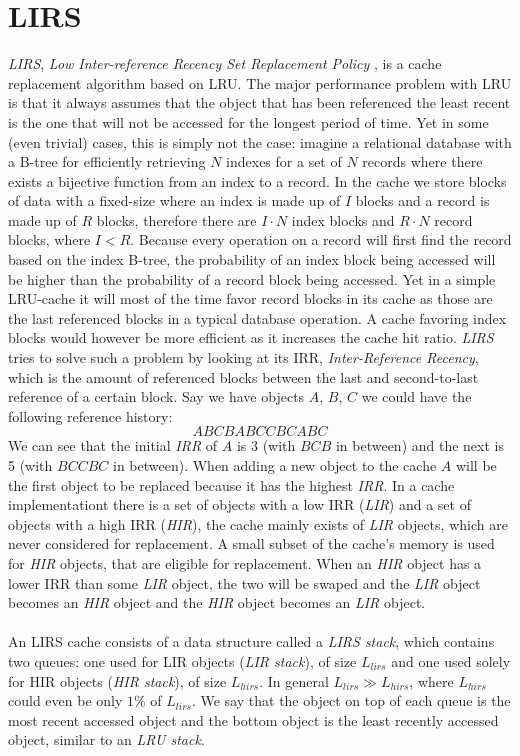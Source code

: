 \documentclass[pdftex,a4paper,12pt,twoside]{report}
\begin{document}
\section{LIRS}
\emph{LIRS}, \emph{Low Inter-reference Recency Set Replacement Policy} \citep{jiang2002lirs}, is a cache replacement algorithm based on LRU. 
The major performance problem with LRU is that it always assumes that the object that has been referenced the least recent is the one that will not be accessed for the longest period of time. Yet in some (even trivial) cases, this is simply not the case: imagine a relational database with a B-tree for efficiently retrieving $N$ indexes for a set of $N$ records where there exists a bijective function from an index to a record. In the cache we store blocks of data with a fixed-size where an index is made up of $I$ blocks and a record is made up of $R$ blocks, therefore there are $I \cdot N$ index blocks and $R \cdot N$ record blocks, where $I < R$. Because every operation on a record will first find the record based on the index B-tree, the probability of an index block being accessed will be higher than the probability of a record block being accessed. Yet in a simple LRU-cache it will most of the time favor record blocks in its cache as those are the last referenced blocks in a typical database operation. A cache favoring index blocks would however be more efficient as it increases the cache hit ratio. \emph{LIRS} tries to solve such a problem by looking at its IRR, \emph{Inter-Reference Recency}, which is the amount of referenced blocks between the last and second-to-last reference of a certain block. Say we have objects $A$, $B$, $C$ we could have the following reference history:
\[ABCBABCCBCABC\]
We can see that the initial \emph{IRR} of $A$ is 3 (with $BCB$ in between) and the next is 5 (with $BCCBC$ in between). When adding a new object to the cache $A$ will be the first object to be replaced because it has the highest \emph{IRR}. In a cache implementationt there is a set of objects with a low IRR (\emph{LIR}) and a set of objects with a high IRR (\emph{HIR}), the cache mainly exists of \emph{LIR} objects, which are never considered for replacement. A small subset of the cache's memory is used for \emph{HIR} objects, that are eligible for replacement. When an \emph{HIR} object has a lower IRR than some \emph{LIR} object, the two will be swaped and the \emph{LIR} object becomes an \emph{HIR} object and the \emph{HIR} object becomes an \emph{LIR} object.
\\\\
An LIRS cache consists of a data structure called a \emph{LIRS stack}, which contains two queues: one used for LIR objects (\emph{LIR stack}), of size $L_{lirs}$ and one used solely for HIR objects (\emph{HIR stack}), of size $L_{hirs}$. In general $L_{lirs} \gg L_{hirs}$, where $L_{hirs}$ could even be only $1\%$ of $L_{lirs}$. We say that the object on top of each queue is the most recent accessed object and the bottom object is the least recently accessed object, similar to an \emph{LRU stack}.
\end{document}
